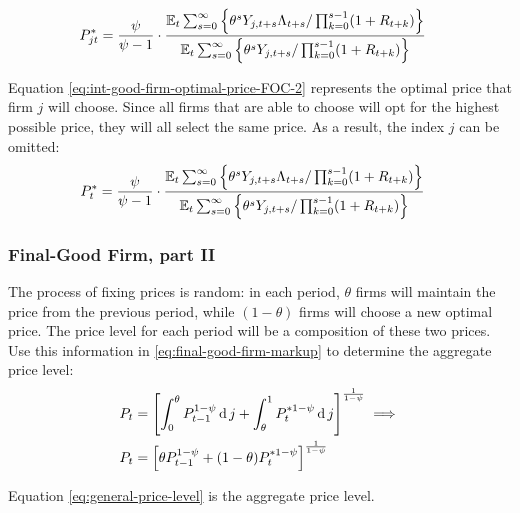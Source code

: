 \documentclass[
thesis.tex
]{subfiles}
\begin{document}
	\begin{align}
		\label{eq:int-good-firm-optimal-price-FOC-2}
		P_{jt}^\ast &= 
		\frac{\psi}{\psi-1} \cdot
		\frac{
			{\mathbb{E}_{t}} \sum_{s=0}^{\infty} \left\{ 
			\theta^s Y_{j,t+s} \Lambda_{t+s} / \prod_{k=0}^{s-1}(1+R_{t+k}) \right\} } {{\mathbb{E}_{t}} \sum_{s=0}^{\infty} \left\{
			\theta^s Y_{j,t+s} / \prod_{k=0}^{s-1}(1+R_{t+k}) \right\}}
	\end{align}
	
	
	Equation \ref{eq:int-good-firm-optimal-price-FOC-2} represents the optimal price that firm $j$ will choose. Since all firms that are able to choose will opt for the highest possible price, they will all select the same price. As a result, the index $j$ can be omitted:
	\begin{align}
		\label{eq:int-good-firm-optimal-price-FOC-3}
		P_t^\ast &= 
		\frac{\psi}{\psi-1} \cdot
		\frac{
			{\mathbb{E}_{t}} \sum_{s=0}^{\infty} \left\{ 
			\theta^s Y_{j,t+s} \Lambda_{t+s} / \prod_{k=0}^{s-1}(1+R_{t+k}) \right\} } {{\mathbb{E}_{t}} \sum_{s=0}^{\infty} \left\{
			\theta^s Y_{j,t+s} / \prod_{k=0}^{s-1}(1+R_{t+k}) \right\}}
	\end{align}
	
	
	\subsubsection{Final-Good Firm, part II}
	
	The process of fixing prices is random: in each period, $\theta$ firms will maintain the price from the previous period, while $(1-\theta)$ firms will choose a new optimal price. The price level for each period will be a composition of these two prices. Use this information in \ref{eq:final-good-firm-markup} to determine the aggregate price level:
	\begin{align}
		P_t & = \left[ \int_{0}^{\theta} P_{t-1}^{1-\psi} \operatorname{d} j + \int_{\theta}^{1} P_t^{\ast 1-\psi} \operatorname{d} j \right]^{\frac{1}{1-\psi}}  \implies \nonumber \\
		P_t & = \left[ \theta P_{t-1}^{1-\psi} + (1-\theta) P_t^{\ast 1-\psi} \right]^\frac{1}{1-\psi} \label{eq:general-price-level}
	\end{align}
	
	Equation \ref{eq:general-price-level} is the aggregate price level.
	
\end{document}
